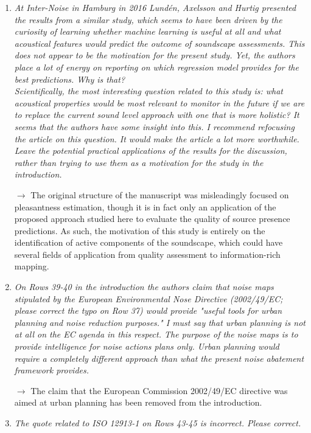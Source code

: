\documentclass[10pt]{article}
\begin{document}
\begin{enumerate}
\item \emph{At Inter-Noise in Hamburg in 2016 Lund\'en, Axelsson and Hurtig presented the results from a similar study, which seems to have been driven by the curiosity of learning whether machine learning is useful at all and what acoustical features would predict the outcome of soundscape assessments. This does not appear to be the motivation for the present study. Yet, the authors place a lot of energy on reporting on which regression model provides for the best predictions. Why is that?\\
Scientifically, the most interesting question related to this study is: what acoustical properties would be most relevant to monitor in the future if we are to replace the current sound level approach with one that is more holistic? It seems that the authors have some insight into this. I recommend refocusing the article on this question. It would make the article a lot more worthwhile. Leave the potential practical applications of the results for the discussion, rather than trying to use them as a motivation for the study in the introduction.}

$\rightarrow$ The original structure of the manuscript was misleadingly focused on pleasantness estimation, though it is in fact only an application of the proposed approach studied here to evaluate the quality of source presence predictions. As such, the motivation of this study is entirely on the identification of active components of the soundscape, which could have several fields of application from quality assessment to information-rich mapping.

\item \emph{On Rows 39-40 in the introduction the authors claim that noise maps stipulated by the European Environmental Nose Directive (2002/49/EC; please correct the typo on Row 37) would provide "useful tools for urban planning and noise reduction purposes." I must say that urban planning is not at all on the EC agenda in this respect. The purpose of the noise maps is to provide intelligence for noise actions plans only. Urban planning would require a completely different approach than what the present noise abatement framework provides.}

$\rightarrow$ The claim that the European Commission 2002/49/EC directive was aimed at urban planning has been removed from the introduction.

\item \emph{The quote related to ISO 12913-1 on Rows 43-45 is incorrect. Please correct.}


\end{enumerate}
\end{document}
